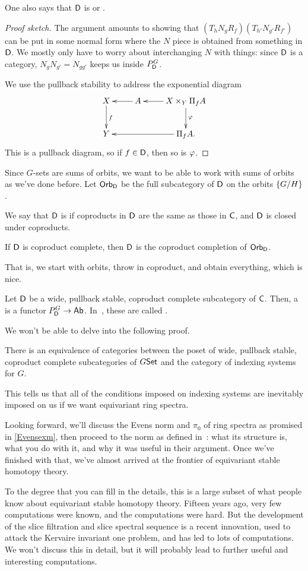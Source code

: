 One also says that $\mathsf D$ is  or .
\begin{proof}[Proof sketch]
The argument amounts to showing that $(T_h N_g R_f)(T_{h'}N_{g'}R_{f'})$ can be put in some normal form where the
$N$ piece is obtained from something in $\mathsf D$. We mostly only have to worry about interchanging $N$ with things:
since $\mathsf D$ is a category, $N_gN_{g'} = N_{gg'}$ keeps us inside $P_\mathsf D^G$.

We use the pullback stability to address the exponential diagram
\[\xymatrix{
	X\ar[d]^f & A\ar[l] & X\times_Y\Pi_fA\ar[d]^\vp\ar[l]\\
	Y && \Pi_f A.\ar[ll]
}\]
This is a pullback diagram, so if $f\in\mathsf D$, then so is $\varphi$.
\end{proof}
Since $G$-sets are sums of orbits, we want to be able to work with sums of orbits as we've done before. Let
$\mathsf{Orb}_\mathsf D$ be the full subcategory of $\mathsf D$ on the orbits $\{G/H\}$.
\begin{defn}
We say that $\mathsf D$ is  if coproducts in $\mathsf D$ are the same as those in $\mathsf C$, and $\mathsf D$ is
closed under coproducts.
\end{defn}
\begin{lem}
If $\mathsf D$ is coproduct complete, then $\mathsf D$ is the coproduct completion of $\mathsf{Orb}_\mathsf D$.
\end{lem}
That is, we start with orbits, throw in coproduct, and obtain everything, which is nice.
\begin{defn}
Let $\mathsf D$ be a wide, pullback stable, coproduct complete subcategory of $\mathsf C$. Then, a  is a functor $P_\mathsf D^G\to\mathsf{Ab}$. In~\cite{BlumbergHill}, these are called
.
\end{defn}
We won't be able to delve into the following proof.
\begin{thm}
There is an equivalence of categories between the poset of wide, pullback stable, coproduct complete subcategories
of $G\mathsf{Set}$ and the category of indexing systems for $G$.
\end{thm}
This tells us that all of the conditions imposed on indexing systems are inevitably imposed on us if we want
equivariant ring spectra.

Looking forward, we'll discuss the Evens norm and $\pi_0$ of ring spectra as promised in \cref{Evensexm}, then
proceed to the norm as defined in~\cite{HHR}: what its structure is, what you do with it, and why it was useful in
their argument. Once we've finished with that, we've almost arrived at the frontier of equivariant stable homotopy
theory.

To the degree that you can fill in the details, this is a large subset of what people know about equivariant stable
homotopy theory. Fifteen years ago, very few computations were known, and the computations were hard. But the
development of the slice filtration and slice spectral sequence is a recent innovation, used to attack the Kervaire
invariant one problem, and has led to lots of computations. We won't discuss this in detail, but it will probably
lead to further useful and interesting computations.
